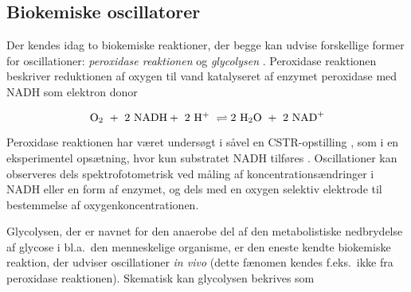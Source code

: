 \subsection{Biokemiske oscillatorer}
{
\newcommand{\oxy}    {\mbox{O$_2$ }}
\newcommand{\htoo}   {\mbox{H$_2$O }}
\newcommand{\prot}   {\mbox{H$^+$ }}
Der kendes idag to biokemiske reaktioner, der begge kan
udvise forskellige former for oscillationer: {\em
peroxidase reaktionen\/} og {\em glycolysen\/}
\cite{BioChaos}. Peroxidase reaktionen beskriver
reduktionen af oxygen til vand katalyseret af enzymet
peroxidase med NADH som elektron donor

\begin{equation}
 \oxy +~2~{\rm NADH} +~2~\prot \rightleftharpoons
 2~\htoo +~2~{\rm NAD}^+
\end{equation}

Peroxidase reaktionen har v{\ae}ret unders{\o}gt i
s{\aa}vel en CSTR-opstilling \cite{Per1}, som i en
eksperimentel ops{\ae}tning, hvor kun substratet NADH
tilf{\o}res \cite{Per2}. Oscillationer kan observeres dels
spektrofotometrisk ved m{\aa}ling af
koncentrations{\ae}ndringer i NADH eller en form af
enzymet, og dels med en oxygen selektiv elektrode til
bestemmelse af oxygenkoncentrationen.

\vspace{4.0mm}
Glycolysen, der er navnet for den anaerobe del af den
metabolistiske nedbrydelse af glycose i bl.a.\ den
menneskelige organisme, er den eneste kendte biokemiske
reaktion, der udviser oscillationer {\em in vivo\/} (dette
f{\ae}nomen kendes f.eks.\ ikke fra peroxidase reaktionen).
Skematisk kan glycolysen bekrives som

}
